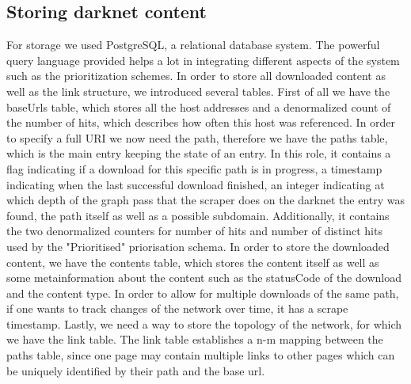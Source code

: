 \documentclass[USenglish,oneside,twocolumn]{article}
\begin{document}
\subsection{Storing darknet content}
For storage we used PostgreSQL, a relational database system. The powerful query language provided helps a lot in integrating different aspects of the system such as the prioritization schemes. In order to store all downloaded content as well as the link structure, we introduced several tables. First of all we have the baseUrls table, which stores all the host addresses and a denormalized count of the number of hits, which describes how often this host was referenced. In order to specify a full URI we now need the path, therefore we have the paths table, which is the main entry keeping the state of an entry. In this role, it contains a flag indicating if a download for this specific path is in progress, a timestamp indicating when the last successful download finished, an integer indicating at which depth of the graph pass that the scraper does on the darknet the entry was found, the path itself as well as a possible subdomain. Additionally, it contains the two denormalized counters for number of hits and number of distinct hits used by the "Prioritised" priorisation schema. In order to store the downloaded content, we have the contents table, which stores the content itself as well as some metainformation about the content such as the statusCode of the download and the content type. In order to allow for multiple downloads of the same path, if one wants to track changes of the network over time, it has a scrape timestamp. Lastly, we need a way to store the topology of the network, for which we have the link table. The link table establishes a n-m mapping between the paths table, since one page may contain multiple links to other pages which can be uniquely identified by their path and the base url.
\end{document}
